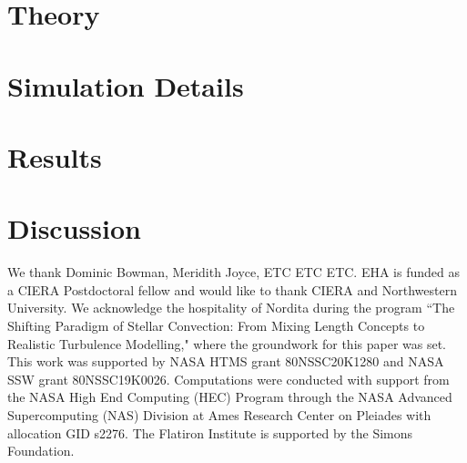\documentclass[twocolumn]{aastex631}
\newcommand{\gradad}{\ensuremath{\nabla_{\rm{ad}}}}
\renewcommand{\vec}[1]{\boldsymbol{#1}}
\renewcommand{\dot}{\vec{\cdot}}
\newcommand{\grad}{\vec{\nabla}}
\begin{document}
\section{Theory}
\label{sec:theory}


\section{Simulation Details}
\label{sec:sim_details}

\section{Results}
\label{sec:results}


\section{Discussion}
\label{sec:discussion}


\begin{acknowledgments}
We thank Dominic Bowman, Meridith Joyce, ETC ETC ETC.
EHA is funded as a CIERA Postdoctoral fellow and would like to thank CIERA and Northwestern University. 
We acknowledge the hospitality of Nordita during the program ``The Shifting Paradigm of Stellar Convection: From Mixing Length Concepts to Realistic Turbulence Modelling," where the groundwork for this paper was set.
This work was supported by NASA HTMS grant 80NSSC20K1280 and NASA SSW grant 80NSSC19K0026.
Computations were conducted with support from the NASA High End Computing (HEC) Program through the NASA Advanced Supercomputing (NAS) Division at Ames Research Center on Pleiades with allocation GID s2276.
The Flatiron Institute is supported by the Simons Foundation.
\end{acknowledgments}


\appendix
\end{document}
